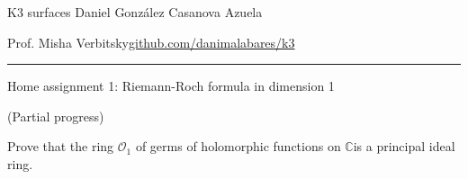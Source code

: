 


\usepackage[style=authortitle-terse,backend=bibtex]{biblatex}




\begin{minipage}{\textwidth}
	\begin{minipage}{1\textwidth}
		K3 surfaces \hfill Daniel González Casanova Azuela
		
		{\small Prof. Misha Verbitsky\hfill\href{https://github.com/danimalabares/k3}{github.com/danimalabares/k3}}
	\end{minipage}
\end{minipage}\vspace{.2cm}\hrule

\vspace{10pt}
{\huge Home assignment 1: Riemann-Roch formula in dimension 1}

(Partial progress)

\begin{manualexercise}{1}
	Prove that the ring $\mathcal{O}_1$ of germs of holomorphic functions on $\mathbb{C}$is a principal ideal ring.
\end{manualexercise}

